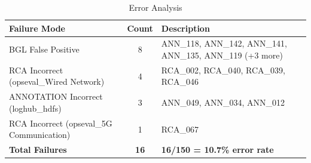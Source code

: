 \begin{table}[h]
\centering
\caption{Error Analysis}
\label{tab:error-analysis}
\begin{tabular}{lcp{8cm}}
\toprule
\textbf{Failure Mode} & \textbf{Count} & \textbf{Description} \\
\midrule
BGL False Positive & 8 & ANN_118, ANN_142, ANN_141, ANN_135, ANN_119 (+3 more) \\
RCA Incorrect (opseval_Wired Network) & 4 & RCA_002, RCA_040, RCA_039, RCA_046 \\
ANNOTATION Incorrect (loghub_hdfs) & 3 & ANN_049, ANN_034, ANN_012 \\
RCA Incorrect (opseval_5G Communication) & 1 & RCA_067 \\
\midrule
\textbf{Total Failures} & \textbf{16} & \textbf{16/150 = 10.7\% error rate} \\
\bottomrule
\end{tabular}
\end{table}

